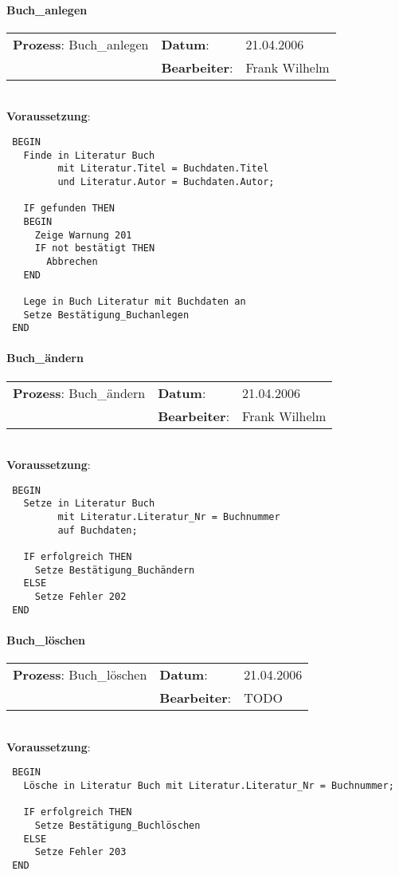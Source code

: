 \paragraph{Buch\_anlegen}
\begin{tabular}[t]{p{9.5cm}ll}
\textbf{Prozess}: Buch\_anlegen  	&\textbf{Datum}:      &21.04.2006\\
					&\textbf{Bearbeiter}: &Frank Wilhelm\\
\end{tabular}

\hrulefill\\
\textbf{Voraussetzung}:
\begin{verbatim}
 BEGIN
   Finde in Literatur Buch
         mit Literatur.Titel = Buchdaten.Titel
         und Literatur.Autor = Buchdaten.Autor;
 
   IF gefunden THEN
   BEGIN
     Zeige Warnung 201
     IF not bestätigt THEN
       Abbrechen
   END
   
   Lege in Buch Literatur mit Buchdaten an
   Setze Bestätigung_Buchanlegen
 END
\end{verbatim}
\hrulefill



\paragraph{Buch\_ändern}
\begin{tabular}[t]{p{9.5cm}ll}
\textbf{Prozess}: Buch\_ändern  	&\textbf{Datum}:      &21.04.2006\\
					&\textbf{Bearbeiter}: &Frank Wilhelm\\
\end{tabular}

\hrulefill\\
\textbf{Voraussetzung}:
\begin{verbatim}
 BEGIN
   Setze in Literatur Buch
         mit Literatur.Literatur_Nr = Buchnummer
         auf Buchdaten;
  
   IF erfolgreich THEN
     Setze Bestätigung_Buchändern
   ELSE
     Setze Fehler 202
 END
\end{verbatim}
\hrulefill



\paragraph{Buch\_löschen}
\begin{tabular}[t]{p{9.5cm}ll}
\textbf{Prozess}: Buch\_löschen  	&\textbf{Datum}:      &21.04.2006\\
					&\textbf{Bearbeiter}: &TODO\\
\end{tabular}

\hrulefill\\
\textbf{Voraussetzung}:
\begin{verbatim}
 BEGIN
   Lösche in Literatur Buch mit Literatur.Literatur_Nr = Buchnummer;
   
   IF erfolgreich THEN
     Setze Bestätigung_Buchlöschen
   ELSE
     Setze Fehler 203
 END
\end{verbatim}
\hrulefill